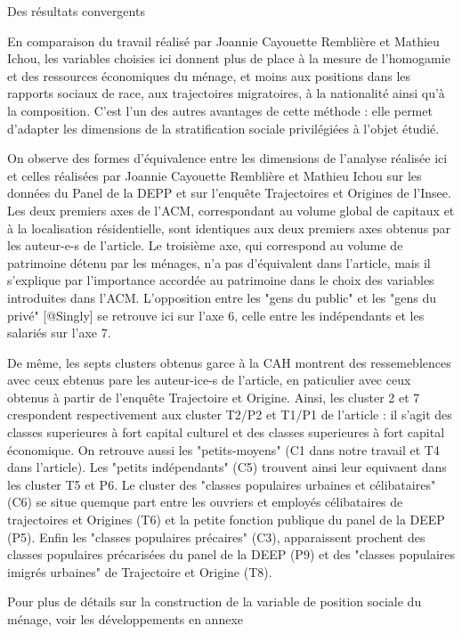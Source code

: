 \documentclass[
  12pt,
]{book}
\begin{document}
\begin{encadre}{Des résultats convergents}

En comparaison du travail réalisé par Joannie Cayouette Remblière et Mathieu Ichou, les variables choisies ici donnent plus de place à la mesure de l'homogamie et des ressources économiques du ménage, et moins aux positions dans les rapports sociaux de race, aux trajectoires migratoires, à la nationalité ainsi qu'à la composition. C'est l'un des autres avantages de cette méthode : elle permet d'adapter les dimensions de la stratification sociale privilégiées à l'objet étudié.

On observe des formes d'équivalence entre les dimensions de l'analyse réalisée ici et celles réalisées par Joannie Cayouette Remblière et Mathieu Ichou sur les données du Panel de la DEPP et sur l'enquête Trajectoires et Origines de l'Insee. Les deux premiers axes de l'ACM, correspondant au volume global de capitaux et à la localisation résidentielle, sont identiques aux deux premiers axes obtenus par les auteur-e-s de l'article. Le troisième axe, qui correspond au volume de patrimoine détenu par les ménages, n'a pas d'équivalent dans l'article, mais il s'explique par l'importance accordée au patrimoine dans le choix des variables introduites dans l'ACM. L'opposition entre les "gens du public" et les "gens du privé" [@Singly] se retrouve ici sur l'axe 6, celle entre les indépendants et les salariés sur l'axe 7. 

De même, les septs clusters obtenus garce à la CAH montrent des ressemeblences avec ceux ebtenus pare les auteur-ice-s de l'article, en paticulier avec ceux obtenus à partir de l'enquête Trajectoire et Origine. Ainsi, les cluster 2 et 7 crespondent respectivement aux cluster T2/P2 et T1/P1 de l'article : il s'agit des classes superieures à fort capital culturel et des classes superieures à fort capital économique. On retrouve aussi les "petits-moyens" (C1 dans notre travail et T4 dans l'article). Les "petits indépendants" (C5) trouvent ainsi leur equivaent dans les cluster T5 et P6. Le cluster des "classes populaires urbaines et célibataires" (C6) se situe quemque part entre les ouvriers et employés célibataires de trajectoires et Origines (T6) et la petite fonction publique du panel de la DEEP (P5). Enfin les "classes populaires précaires" (C3), apparaissent prochent des classes populaires précarisées du panel de la DEEP (P9) et des "classes populaires imigrés urbaines" de Trajectoire et Origine (T8).


Pour plus de détails sur la construction de la variable de position sociale du ménage, voir les développements en annexe

\end{encadre}
\end{document}
